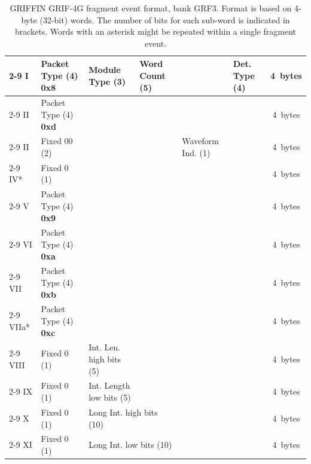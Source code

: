 \documentclass[letterpaper,12pt,notitlepage]{report}
\begin{document}
\begin{landscape}
\begin{table}
\caption{GRIFFIN GRIF-4G fragment event format, bank GRF3. Format is based on 4-byte (32-bit) words. The number of bits for each sub-word is indicated in brackets. Words with an asterisk might be repeated within a single fragment event.}
\begin{tabular*}{\textwidth}{p{0.9cm}|p{2.25cm}|p{2.2cm}|p{2.2cm}|p{2.2cm}|p{2.2cm}|p{2.2cm}|p{2.2cm}|p{2.2cm}|c}
\cline{2-9}
I & Packet Type (4) {\bf 0x8} & Module Type (3) & Word Count (5) & \multicolumn{4}{p{8.8cm}|}{\centering{Address (16)}} & Det. Type (4) & 4~bytes\\
\cline{2-9}
II & Packet Type (4) {\bf 0xd} & \multicolumn{7}{p{15.4cm}|}{\centering{Network Packet Counter Value (28)}} & 4~bytes\\
\cline{2-9}
II & Fixed 00 (2) & \multicolumn{3}{p{6.6cm}|}{\centering{Filter Patterns (14)}} & Waveform Ind. (1) & \multicolumn{3}{p{6.6cm}|}{\centering{reserved (15)}} & 4~bytes\\
\cline{2-9}
IV* & Fixed 0 (1) & \multicolumn{7}{p{15.4cm}|}{\centering{Filter Condition Counter Value (31)}} & 4~bytes\\
\cline{2-9}
V & Packet Type (4) {\bf 0x9} & \multicolumn{7}{p{15.4cm}|}{\centering{Channel Hit Detection Counter Value (28)}} & 4~bytes\\
\cline{2-9}
VI & Packet Type (4) {\bf 0xa} & \multicolumn{7}{p{15.4cm}|}{\centering{Time Stamp low bits (28)}} & 4~bytes\\
\cline{2-9}
VII & Packet Type (4) {\bf 0xb} & \multicolumn{3}{p{6.6cm}|}{\centering{Deadtime (14)}} & \multicolumn{4}{p{8.8cm}|}{\centering{Time Stamp high bits (14)}} & 4~bytes\\
\cline{2-9}
VIIa* & Packet Type (4) {\bf 0xc} & \multicolumn{7}{p{15.4cm}|}{\centering{Waveform Sample (28)}} & 4~bytes\\
\cline{2-9}
VIII & Fixed 0 (1) & Int. Len. high bits (5) & \multicolumn{6}{p{13.2cm}|}{\centering{Pulse Height (26)}} & 4~bytes\\
\cline{2-9}
IX & Fixed 0 (1) & Int. Length low bits (5) & \multicolumn{6}{p{13.2cm}|}{\centering{CFD Timing (26)}} & 4~bytes\\
\cline{2-9}
X & Fixed 0 (1) & \multicolumn{2}{p{4.4cm}|}{Long Int. high bits (10)} & \multicolumn{5}{p{11.0cm}|}{\centering{Short Charge Integration (21)}} & 4~bytes\\
\cline{2-9}
XI & Fixed 0 (1) & \multicolumn{2}{p{4.4cm}|}{Long Int. low bits (10)} & \multicolumn{5}{p{11.0cm}|}{\centering{Zero-Crossing Time (21)}} & 4~bytes\\

\end{tabular*}
\end{table}
\end{landscape}
\end{document}
